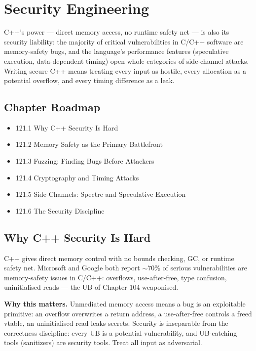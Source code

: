 \chapter{Security Engineering}

C++'s power --- direct memory access, no runtime safety net --- is also its security liability: the majority of critical vulnerabilities in C/C++ software are memory-safety bugs, and the language's performance features (speculative execution, data-dependent timing) open whole categories of side-channel attacks. Writing secure C++ means treating every input as hostile, every allocation as a potential overflow, and every timing difference as a leak.

\section*{Chapter Roadmap}
\begin{itemize}
\item 121.1 Why C++ Security Is Hard
\item 121.2 Memory Safety as the Primary Battlefront
\item 121.3 Fuzzing: Finding Bugs Before Attackers
\item 121.4 Cryptography and Timing Attacks
\item 121.5 Side-Channels: Spectre and Speculative Execution
\item 121.6 The Security Discipline
\end{itemize}

\section{Why C++ Security Is Hard}
C++ gives direct memory control with no bounds checking, GC, or runtime safety net. Microsoft and Google both report $\sim$70\% of serious vulnerabilities are memory-safety issues in C/C++: overflows, use-after-free, type confusion, uninitialised reads --- the UB of Chapter 104 weaponised.

\textbf{Why this matters.} Unmediated memory access means a bug is an exploitable primitive: an overflow overwrites a return address, a use-after-free controls a freed vtable, an uninitialised read leaks secrets. Security is inseparable from the correctness discipline: every UB is a potential vulnerability, and UB-catching tools (sanitizers) are security tools. Treat all input as adversarial.

